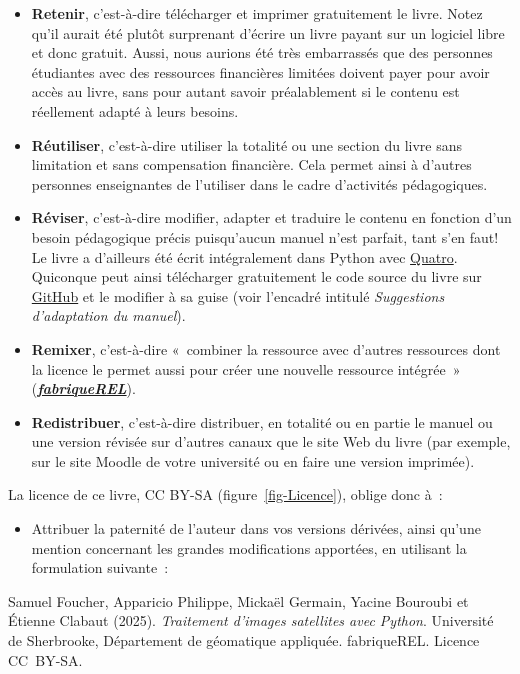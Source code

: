 \documentclass[
  11pt,
  letterpaper,
  open=any,
  twoside=false,
  french]{scrbook}
\providecommand{\tightlist}{%
  \setlength{\itemsep}{0pt}\setlength{\parskip}{0pt}}\usepackage{longtable,booktabs,array}
\begin{document}
\begin{itemize}
\item
  \textbf{Retenir}, c'est-à-dire télécharger et imprimer gratuitement le
  livre. Notez qu'il aurait été plutôt surprenant d'écrire un livre
  payant sur un logiciel libre et donc gratuit. Aussi, nous aurions été
  très embarrassés que des personnes étudiantes avec des ressources
  financières limitées doivent payer pour avoir accès au livre, sans
  pour autant savoir préalablement si le contenu est réellement adapté à
  leurs besoins.
\item
  \textbf{Réutiliser}, c'est-à-dire utiliser la totalité ou une section
  du livre sans limitation et sans compensation financière. Cela permet
  ainsi à d'autres personnes enseignantes de l'utiliser dans le cadre
  d'activités pédagogiques.
\item
  \textbf{Réviser}, c'est-à-dire modifier, adapter et traduire le
  contenu en fonction d'un besoin pédagogique précis puisqu'aucun manuel
  n'est parfait, tant s'en faut! Le livre a d'ailleurs été écrit
  intégralement dans Python avec \href{https://quarto.org/}{Quatro}.
  Quiconque peut ainsi télécharger gratuitement le code source du livre
  sur
  \href{https://github.com/serie-python-tele/TraitementImagesPythonVol1}{GitHub}
  et le modifier à sa guise (voir l'encadré intitulé \emph{Suggestions
  d'adaptation du manuel}).
\item
  \textbf{Remixer}, c'est-à-dire «~combiner la ressource avec d'autres
  ressources dont la licence le permet aussi pour créer une nouvelle
  ressource intégrée~»
  (\href{https://fabriquerel.org/rel/}{\textbf{\emph{fabriqueREL}}}).
\item
  \textbf{Redistribuer}, c'est-à-dire distribuer, en totalité ou en
  partie le manuel ou une version révisée sur d'autres canaux que le
  site Web du livre (par exemple, sur le site Moodle de votre université
  ou en faire une version imprimée).
\end{itemize}

La licence de ce livre, CC BY-SA (figure~\ref{fig-Licence}), oblige donc
à~:

\begin{itemize}
\tightlist
\item
  Attribuer la paternité de l'auteur dans vos versions dérivées, ainsi
  qu'une mention concernant les grandes modifications apportées, en
  utilisant la formulation suivante~:
\end{itemize}

Samuel Foucher, Apparicio Philippe, Mickaël Germain, Yacine Bouroubi et
Étienne Clabaut (2025). \emph{Traitement d'images satellites avec
Python}. Université de Sherbrooke, Département de géomatique appliquée.
fabriqueREL. Licence CC~BY-SA.
\end{document}
